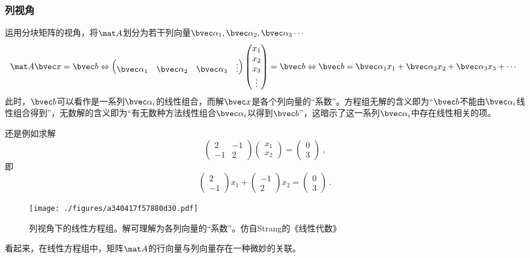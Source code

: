 \subsubsection{列视角}
运用分块矩阵的视角，将$\mat A$划分为若干列向量$\bvec \alpha_1, \bvec \alpha_2,\bvec \alpha_3\cdots$
$$
\mat A \bvec x=\bvec b \Leftrightarrow 
\begin{pmatrix}
\bvec \alpha_1& \bvec \alpha_2& \bvec \alpha_3&\vdots
\end{pmatrix}
\begin{pmatrix}
x_{1} \\
x_{2} \\
x_{3} \\
\vdots
\end{pmatrix}
=
\bvec b
\Leftrightarrow 
\bvec b = \bvec \alpha_1 x_1+\bvec \alpha_2 x_2+\bvec \alpha_3 x_3+\cdots~
$$
此时，$\bvec b$可以看作是一系列$\bvec \alpha_i$的线性组合，而解$\bvec x$是各个列向量的“系数”。方程组无解的含义即为“$\bvec b$不能由$\bvec \alpha_i$线性组合得到”，无数解的含义即为“有无数种方法线性组合$\bvec \alpha_i$以得到$\bvec b$”，这暗示了这一系列$\bvec \alpha_i$中存在线性相关的项。

\begin{example}{}
还是例如求解
$$
\begin{pmatrix}
2&-1 \\
-1&2
\end{pmatrix}
\begin{pmatrix}
x_1 \\
x_2
\end{pmatrix}
=
\begin{pmatrix}
0 \\
3
\end{pmatrix}~,
$$
即
$$
\begin{pmatrix}
2 \\
-1
\end{pmatrix}
x_1
+
\begin{pmatrix}
-1 \\
2
\end{pmatrix}
x_2
=
\begin{pmatrix}
0 \\
3
\end{pmatrix}~.
$$
\begin{figure}[ht]
\centering
\texttt{[image: ./figures/a340417f57880d30.pdf]}
\caption{列视角下的线性方程组。解可理解为各列向量的“系数”。仿自Strang的《线性代数》} \label{fig_LinEq_4}
\end{figure}
\end{example}
看起来，在线性方程组中，矩阵$\mat A$的行向量与列向量存在一种微妙的关联。

